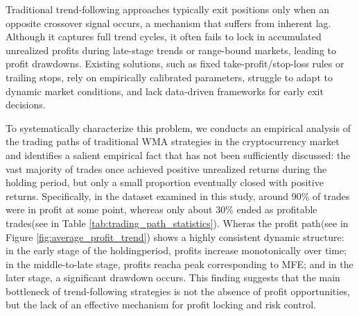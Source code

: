 \documentclass[12pt]{article}
\begin{document}
Traditional trend-following approaches typically exit positions only when an opposite crossover signal occurs, a mechanism that suffers from inherent lag. Although it captures full trend cycles, it often fails to lock in accumulated unrealized profits during late-stage trends or range-bound markets, leading to profit drawdowns. Existing solutions, such as fixed take-profit/stop-loss rules or trailing stops, rely on empirically calibrated parameters, struggle to adapt to dynamic market conditions, and lack data-driven frameworks for early exit decisions.

To systematically characterize this problem, we conducts an empirical analysis of the trading paths of traditional WMA strategies in the cryptocurrency market and identifies a salient empirical fact that has not been sufficiently discussed: the vast majority of trades once achieved positive unrealized returns during the holding period, but only a small proportion eventually closed with positive returns. Specifically, in the dataset examined in this study, around 90\% of trades were in profit at some point, whereas only about 30\% ended as profitable trades(see in Table \ref{tab:trading_path_statistics}). Wheras the profit path(see in Figure \ref{fig:average_profit_trend}) shows a highly consistent dynamic structure: in the early stage of the holdingperiod, profits increase monotonically over time; in the middle-to-late stage, profits reacha peak corresponding to MFE; and in the later stage, a significant drawdown occurs. This finding suggests that the main bottleneck of trend-following strategies is not the absence of profit opportunities, but the lack of an effective mechanism for profit locking and risk control.
\end{document}
